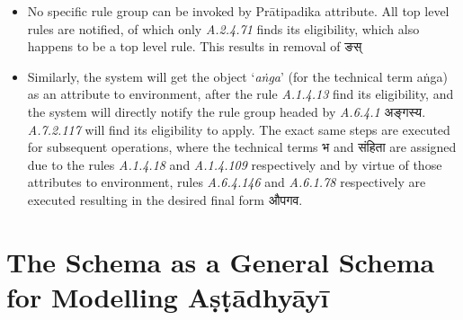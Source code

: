 \documentclass[11pt]{article}
\begin{document}
\begin{itemize}
\item No specific rule group can be invoked by Prātipadika attribute. All top level rules are notified, of which only {\sl A.2.4.71} finds its eligibility, which also happens to be a top level rule. This results in removal of {\skt ङस्} 

\item Similarly, the system will get the object `{\sl aṅga}' (for the technical term aṅga) as an attribute to environment, after the rule {\sl A.1.4.13} find its eligibility, and the system will directly notify the rule group headed by {\sl A.6.4.1} {\skt अङ्गस्य}. {\sl A.7.2.117} will find its eligibility to apply. The exact same steps are executed for subsequent operations, where the technical terms {\skt भ and संहिता } are assigned due to the rules {\sl A.1.4.18} and {\sl A.1.4.109} respectively and by virtue of those attributes to environment, rules {\sl A.6.4.146} and {\sl A.6.1.78} respectively are executed resulting in the desired final form {\skt औपगव}.

\end{itemize}
\section{The Schema as a General Schema for Modelling Aṣṭādhyāyī}
\label{sect:gen}
\end{document}
